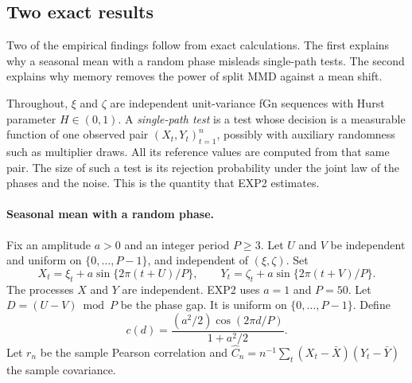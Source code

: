 %
%


\subsection{Two exact results}\label{sec:props}
Two of the empirical findings follow from exact calculations. The first explains why a seasonal mean with a random phase misleads single-path tests. The second explains why memory removes the power of split MMD against a mean shift.

Throughout, $\xi$ and $\zeta$ are independent unit-variance fGn sequences with Hurst parameter $H\in(0,1)$. A \emph{single-path test} is a test whose decision is a measurable function of one observed pair $(X_t,Y_t)_{t=1}^n$, possibly with auxiliary randomness such as multiplier draws. All its reference values are computed from that same pair. The size of such a test is its rejection probability under the joint law of the phases and the noise. This is the quantity that EXP2 estimates.

\paragraph{Seasonal mean with a random phase.}
Fix an amplitude $a>0$ and an integer period $P\ge3$. Let $U$ and $V$ be independent and uniform on $\{0,\ldots,P-1\}$, and independent of $(\xi,\zeta)$. Set
\begin{equation}\label{eq:seasm}
X_t=\xi_t+a\sin\{2\pi(t+U)/P\},\qquad Y_t=\zeta_t+a\sin\{2\pi(t+V)/P\}.
\end{equation}
The processes $X$ and $Y$ are independent. EXP2 uses $a=1$ and $P=50$. Let $D=(U-V)\bmod P$ be the phase gap. It is uniform on $\{0,\ldots,P-1\}$. Define
\begin{equation}\label{eq:climit}
c(d)=\frac{(a^2/2)\cos(2\pi d/P)}{1+a^2/2}.
\end{equation}
Let $r_n$ be the sample Pearson correlation and $\hat C_n=n^{-1}\sum_t(X_t-\bar X)(Y_t-\bar Y)$ the sample covariance.

